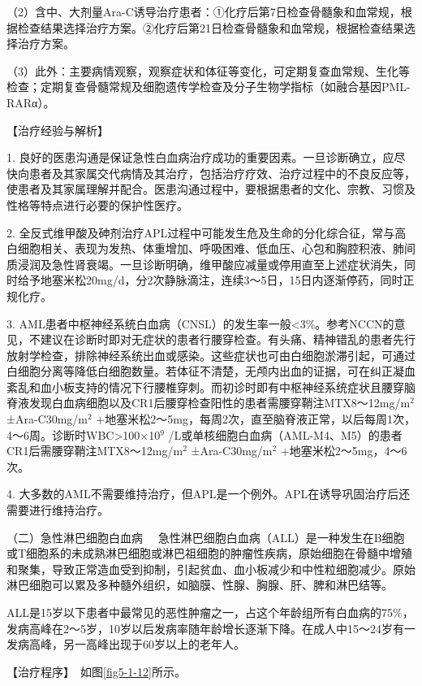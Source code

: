 （2）含中、大剂量Ara-C诱导治疗患者：①化疗后第7日检查骨髓象和血常规，根据检查结果选择治疗方案。②化疗后第21日检查骨髓象和血常规，根据检查结果选择治疗方案。

（3）此外：主要病情观察，观察症状和体征等变化，可定期复查血常规、生化等检查；定期复查骨髓常规及细胞遗传学检查及分子生物学指标（如融合基因PML-RARα）。

【治疗经验与解析】

1.
良好的医患沟通是保证急性白血病治疗成功的重要因素。一旦诊断确立，应尽快向患者及其家属交代病情及其治疗，包括治疗疗效、治疗过程中的不良反应等，使患者及其家属理解并配合。医患沟通过程中，要根据患者的文化、宗教、习惯及性格等特点进行必要的保护性医疗。

2.
全反式维甲酸及砷剂治疗APL过程中可能发生危及生命的分化综合征，常与高白细胞相关、表现为发热、体重增加、呼吸困难、低血压、心包和胸腔积液、肺间质浸润及急性肾衰竭。一旦诊断明确，维甲酸应减量或停用直至上述症状消失，同时给予地塞米松20mg/d，分2次静脉滴注，连续3～5日，15日内逐渐停药，同时正规化疗。

3.
AML患者中枢神经系统白血病（CNSL）的发生率一般<3\%。参考NCCN的意见，不建议在诊断时即对无症状的患者行腰穿检查。有头痛、精神错乱的患者先行放射学检查，排除神经系统出血或感染。这些症状也可由白细胞淤滞引起，可通过白细胞分离等降低白细胞数量。若体征不清楚，无颅内出血的证据，可在纠正凝血紊乱和血小板支持的情况下行腰椎穿刺。而初诊时即有中枢神经系统症状且腰穿脑脊液发现白血病细胞以及CR1后腰穿检查阳性的患者需腰穿鞘注MTX8～12mg/m$^2$
±Ara-C30mg/m$^2$
+地塞米松2～5mg，每周2次，直至脑脊液正常，以后每周1次，4～6周。诊断时WBC\textgreater{}100×10$^{9}$
/L或单核细胞白血病（AML-M4、M5）的患者CR1后需腰穿鞘注MTX8～12mg/m$^2$
±Ara-C30mg/m$^2$ +地塞米松2～5mg，4～6次。

4.
大多数的AML不需要维持治疗，但APL是一个例外。APL在诱导巩固治疗后还需要进行维持治疗。

{（二）急性淋巴细胞白血病}
　急性淋巴细胞白血病（ALL）是一种发生在B细胞或T细胞系的未成熟淋巴细胞或淋巴祖细胞的肿瘤性疾病，原始细胞在骨髓中增殖和聚集，导致正常造血受到抑制，引起贫血、血小板减少和中性粒细胞减少。原始淋巴细胞可以累及多种髓外组织，如脑膜、性腺、胸腺、肝、脾和淋巴结等。

ALL是15岁以下患者中最常见的恶性肿瘤之一，占这个年龄组所有白血病的75\%，发病高峰在2～5岁，10岁以后发病率随年龄增长逐渐下降。在成人中15～24岁有一发病高峰，另一高峰出现于60岁以上的老年人。

【治疗程序】　如图\ref{fig5-1-12}所示。

